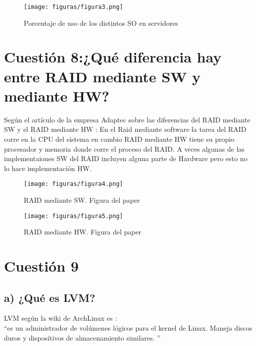 \begin{figure}[H] %
	\centering
	\texttt{[image: figuras/figura3.png]}  %
	\label{figura3}
	
	\caption{Porcentaje de uso de los distintos SO en servidores \cite{perserv}} 
\end{figure}

\section{Cuestión 8:¿Qué diferencia hay entre RAID mediante SW y mediante HW?}
Según el artículo de la empresa Adaptec\cite{adaptec} sobre las diferencias del RAID mediante SW y el RAID mediante HW \cite{raidswhw}:
En el Raid mediante software la tarea del RAID corre en la CPU del sistema en cambio RAID mediante HW tiene su propio procesador y memoria donde corre el proceso del RAID. A veces algunas de las implementaiones SW del RAID incluyen alguna parte de Hardware pero esto no lo hace implementación HW.

\begin{figure}[H] %
	\centering
	\texttt{[image: figuras/figura4.png]}  %
	\label{figura4}
	
	\caption{RAID mediante SW. Figura del paper \cite{raidswhw}} 
\end{figure}
\begin{figure}[H] %
	\centering
	\texttt{[image: figuras/figura5.png]}  %
	\label{figura5}
	
	\caption{RAID mediante HW. Figura del paper \cite{raidswhw}} 
\end{figure}

\section{Cuestión 9}
\subsection{a) ¿Qué es LVM?}
LVM según la wiki de ArchLinux es \cite{lvm}:\\
\textquotedblleft es un administrador de volúmenes lógicos para el kernel de Linux. Maneja discos duros y dispositivos de almacenamiento similares. \textquotedblright
